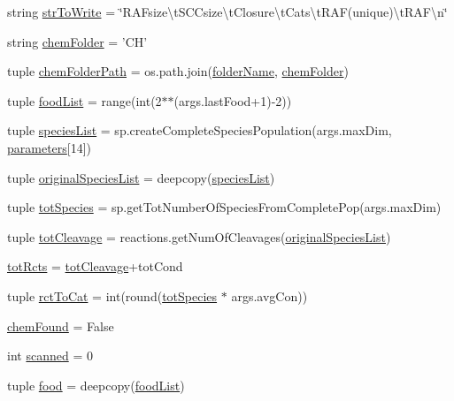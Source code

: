 \begin{DoxyCompactItemize}
\item 
string \hyperlink{a00135_a2425798997b1c46c8bbed77ecffcaa9f}{str\-To\-Write} = \char`\"{}R\-A\-Fsize\textbackslash{}t\-S\-C\-Csize\textbackslash{}t\-Closure\textbackslash{}t\-Cats\textbackslash{}t\-R\-A\-F(unique)\textbackslash{}t\-R\-A\-F\textbackslash{}n\char`\"{}
\item 
string \hyperlink{a00135_a4a57e1e8a830824b985f34ee1af52b93}{chem\-Folder} = 'C\-H'
\item 
tuple \hyperlink{a00135_a633d7089af5a033807ccba3b7e9ad483}{chem\-Folder\-Path} = os.\-path.\-join(\hyperlink{a00135_aa51c106700ef9afbdb94a1c800e10569}{folder\-Name}, \hyperlink{a00135_a4a57e1e8a830824b985f34ee1af52b93}{chem\-Folder})
\item 
tuple \hyperlink{a00135_a402edf66e27aa29932e16311c9756b02}{food\-List} = range(int(2$\ast$$\ast$(args.\-last\-Food+1)-\/2))
\item 
tuple \hyperlink{a00135_a79af2b1d3fe38f2cd259cc56b1ecc5f3}{species\-List} = sp.\-create\-Complete\-Species\-Population(args.\-max\-Dim, \hyperlink{a00135_a646de756d594b9a0eebf18c4eb9ee0d6}{parameters}\mbox{[}14\mbox{]})
\item 
tuple \hyperlink{a00135_ab4024b0cf8a4136e81ae636c9cf6e0e4}{original\-Species\-List} = deepcopy(\hyperlink{a00135_a79af2b1d3fe38f2cd259cc56b1ecc5f3}{species\-List})
\item 
tuple \hyperlink{a00135_a7f8e1635318ca1aac728dd7165aa49b5}{tot\-Species} = sp.\-get\-Tot\-Number\-Of\-Species\-From\-Complete\-Pop(args.\-max\-Dim)
\item 
tuple \hyperlink{a00135_a517da3913f56e5216fa2c68818e04ecc}{tot\-Cleavage} = reactions.\-get\-Num\-Of\-Cleavages(\hyperlink{a00135_ab4024b0cf8a4136e81ae636c9cf6e0e4}{original\-Species\-List})
\item 
\hyperlink{a00135_a1c0855f92c2dd2dd4a30f6624f6e1af0}{tot\-Rcts} = \hyperlink{a00135_a517da3913f56e5216fa2c68818e04ecc}{tot\-Cleavage}+tot\-Cond
\item 
tuple \hyperlink{a00135_afee9c574290c862d3ad8a51a77b2a72e}{rct\-To\-Cat} = int(round(\hyperlink{a00135_a7f8e1635318ca1aac728dd7165aa49b5}{tot\-Species} $\ast$ args.\-avg\-Con))
\item 
\hyperlink{a00135_acdd521d6bd1a71be37421dafd210de99}{chem\-Found} = False
\item 
int \hyperlink{a00135_afafc4f533cad86cb7fd1b6fe5ed9effa}{scanned} = 0
\item 
tuple \hyperlink{a00135_a4fe31b6cfa3dcaa4141be9282566fa7a}{food} = deepcopy(\hyperlink{a00135_a402edf66e27aa29932e16311c9756b02}{food\-List})
$$
\end{DoxyCompactItemize}

